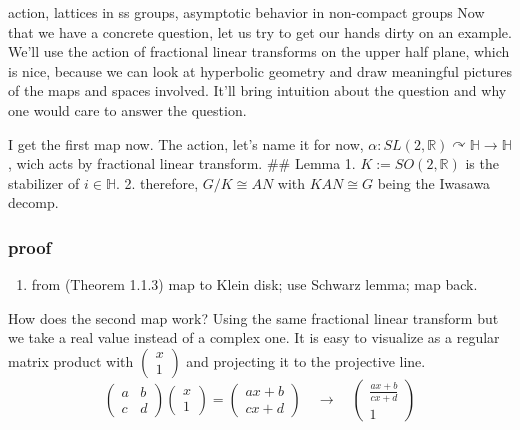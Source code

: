 \documentclass[
]{article}
\providecommand{\tightlist}{%
  \setlength{\itemsep}{0pt}\setlength{\parskip}{0pt}}
\begin{document}
action, lattices in ss groups, asymptotic behavior in non-compact groups
\cite{howe79}
Now that we have a concrete question, let us try to get our hands dirty
on an example. We'll use the action of fractional linear transforms on
the upper half plane, which is nice, because we can look at hyperbolic
geometry and draw meaningful pictures of the maps and spaces involved.
It'll bring intuition about the question and why one would care to
answer the question.

I get the first map now. The action, let's name it for now,
\(\alpha : SL(2, \mathbb{R}) \curvearrowright \mathbb{H} \rightarrow \mathbb{H}\),
wich acts by fractional linear transform. \#\# Lemma 1.
\(K:= SO(2, \mathbb{R})\) is the stabilizer of \(i \in \mathbb{H}\). 2.
therefore, \(G/K \cong AN\) with \(KAN \cong G\) being the Iwasawa
decomp.

\hypertarget{proof}{%
\subsubsection{proof}\label{proof}}

\begin{enumerate}
\def\labelenumi{\arabic{enumi}.}
\tightlist
\item
  from \cite{Miyake89}(Theorem 1.1.3) map to Klein disk; use Schwarz
  lemma; map back.
\end{enumerate}

How does the second map work? Using the same fractional linear transform
but we take a real value instead of a complex one. It is easy to
visualize as a regular matrix product with
\(\begin{pmatrix}x \\ 1\end{pmatrix}\) and projecting it to the
projective line. \[
\begin{pmatrix}a & b \\ c & d\end{pmatrix}\begin{pmatrix}x \\ 1\end{pmatrix} =
\begin{pmatrix}ax + b \\ cx + d\end{pmatrix} \quad \rightarrow \quad
\begin{pmatrix}\frac{ax + b}{cx + d} \\ 1\end{pmatrix}
\] 
\end{document}
